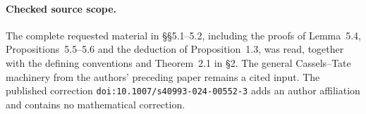 \paragraph{Checked source scope.}
The complete requested material in \S\S5.1--5.2, including the proofs
of Lemma~5.4, Propositions~5.5--5.6 and the deduction of Proposition~1.3,
was read, together with the defining conventions and Theorem~2.1 in
\S2.  The general Cassels--Tate machinery from the authors' preceding
paper remains a cited input.  The published correction
\texttt{doi:10.1007/s40993-024-00552-3} adds an author affiliation and
contains no mathematical correction.
